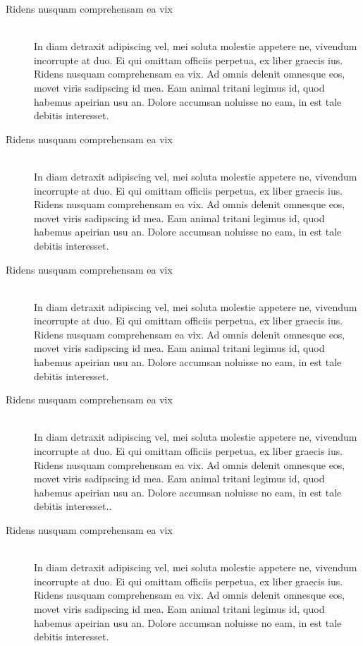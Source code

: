 	\begin{description}

		\item[Ridens nusquam comprehensam ea vix] \hfill \\
			In diam detraxit adipiscing vel, mei soluta molestie appetere ne, vivendum incorrupte at duo. Ei qui omittam officiis perpetua, ex liber graecis ius. Ridens nusquam comprehensam ea vix. Ad omnis delenit omnesque eos, movet viris sadipscing id mea. Eam animal tritani legimus id, quod habemus apeirian usu an. Dolore accumsan noluisse no eam, in est tale debitis interesset.\newline

		\item[Ridens nusquam comprehensam ea vix] \hfill \\
			In diam detraxit adipiscing vel, mei soluta molestie appetere ne, vivendum incorrupte at duo. Ei qui omittam officiis perpetua, ex liber graecis ius. Ridens nusquam comprehensam ea vix. Ad omnis delenit omnesque eos, movet viris sadipscing id mea. Eam animal tritani legimus id, quod habemus apeirian usu an. Dolore accumsan noluisse no eam, in est tale debitis interesset.\newline

		\item[Ridens nusquam comprehensam ea vix] \hfill \\
			In diam detraxit adipiscing vel, mei soluta molestie appetere ne, vivendum incorrupte at duo. Ei qui omittam officiis perpetua, ex liber graecis ius. Ridens nusquam comprehensam ea vix. Ad omnis delenit omnesque eos, movet viris sadipscing id mea. Eam animal tritani legimus id, quod habemus apeirian usu an. Dolore accumsan noluisse no eam, in est tale debitis interesset.\newline

		\item[Ridens nusquam comprehensam ea vix] \hfill \\
			In diam detraxit adipiscing vel, mei soluta molestie appetere ne, vivendum incorrupte at duo. Ei qui omittam officiis perpetua, ex liber graecis ius. Ridens nusquam comprehensam ea vix. Ad omnis delenit omnesque eos, movet viris sadipscing id mea. Eam animal tritani legimus id, quod habemus apeirian usu an. Dolore accumsan noluisse no eam, in est tale debitis interesset..\newline

		\item[Ridens nusquam comprehensam ea vix] \hfill \\
			In diam detraxit adipiscing vel, mei soluta molestie appetere ne, vivendum incorrupte at duo. Ei qui omittam officiis perpetua, ex liber graecis ius. Ridens nusquam comprehensam ea vix. Ad omnis delenit omnesque eos, movet viris sadipscing id mea. Eam animal tritani legimus id, quod habemus apeirian usu an. Dolore accumsan noluisse no eam, in est tale debitis interesset.
	\end{description}

